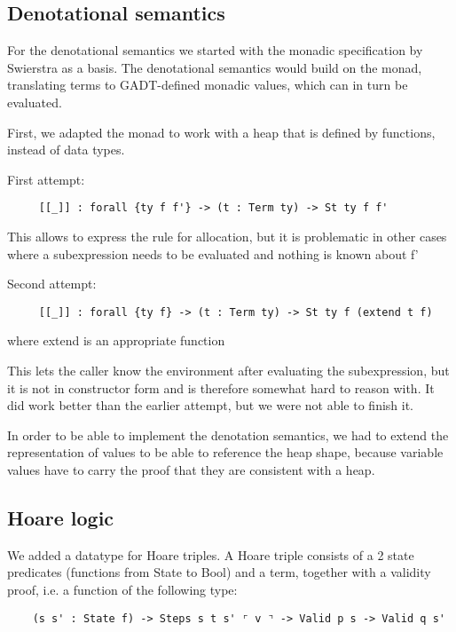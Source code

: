 \documentclass{article}
\begin{document}
\subsection{Denotational semantics} %

For the denotational semantics we started with the monadic
specification by Swierstra as a basis. The denotational semantics
would build on the monad, translating terms to GADT-defined monadic
values, which can in turn be evaluated.

First, we adapted the monad to work with a heap that is defined by
functions, instead of data types.

First attempt:

\begin{lstlisting}
     [[_]] : forall {ty f f'} -> (t : Term ty) -> St ty f f'
\end{lstlisting}

This allows to express the rule for allocation, but it is problematic
in other cases where a subexpression needs to be evaluated and
nothing is known about f'

Second attempt:

\begin{lstlisting}
     [[_]] : forall {ty f} -> (t : Term ty) -> St ty f (extend t f)
\end{lstlisting}
where extend is an appropriate function

This lets the caller know the environment after evaluating the
subexpression, but it is not in constructor form and is therefore
somewhat hard to reason with. It did work better than the earlier
attempt, but we were not able to finish it.

In order to be able to implement the denotation semantics, we had to
extend the representation of values to be able to reference the heap
shape, because variable values have to carry the proof that they are
consistent with a heap.

\subsection{Hoare logic}

We added a datatype for Hoare triples. A Hoare triple consists of a 2 state predicates (functions from State to Bool) and a term, together with a validity proof, i.e. a function of the following type:

\begin{lstlisting}
	(s s' : State f) -> Steps s t s' ⌜ v ⌝ -> Valid p s -> Valid q s'
\end{lstlisting}
\end{document}
